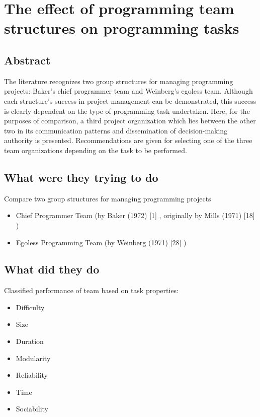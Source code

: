\section{The effect of programming team structures on programming tasks}

\subsection{Abstract}

The literature recognizes two group structures for managing programming projects: Baker's chief programmer team and Weinberg's egoless team. Although each structure's success in project management can be demonstrated, this success is clearly dependent on the type of programming task undertaken. Here, for the purposes of comparison, a third project organization which lies between the other two in its communication patterns and dissemination of decision-making authority is presented. Recommendations are given for selecting one of the three team organizations depending on the task to be performed.

\subsection{What were they trying to do}

Compare two group structures for managing programming projects

\begin{itemize}
    \item Chief Programmer Team (by Baker (1972) [1] \cite{bakerChiefProgrammerTeam1972}, originally by Mills (1971) [18] \cite{mills1971chief})
    \item Egoless Programming Team (by Weinberg (1971) [28] \cite{weinbergPsychologyComputerProgramming1988})
\end{itemize}

\subsection{What did they do}

Classified performance of team based on task properties:

\begin{itemize}
    \item Difficulty
    \item Size
    \item Duration
    \item Modularity
    \item Reliability
    \item Time
    \item Sociability
\end{itemize}

